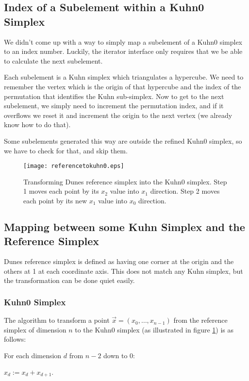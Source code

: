 \documentclass[english,a4paper]{article}
\begin{document}
\subsection{Index of a Subelement within a Kuhn0 Simplex}

We didn't come up with a way to simply map a subelement of a Kuhn0
simplex to an index number.  Luckily, the iterator interface only
requires that we be able to calculate the next subelement.

Each subelement is a Kuhn simplex which triangulates a hypercube.  We
need to remember the vertex which is the origin of that hypercube and
the index of the permutation that identifies the Kuhn sub-simplex.  Now
to get to the next subelement, we simply need to increment the
permutation index, and if it overflows we reset it and increment the
origin to the next vertex (we already know how to do that).

Some subelements generated this way are outside the refined Kuhn0
simplex, so we have to check for that, and skip them.

\begin{figure}
  \centering
  \texttt{[image: referencetokuhn0.eps]}
  \caption{\label{ref2kuhn0} Transforming Dunes reference simplex into
    the Kuhn0 simplex.  Step 1 moves each point by its $x_2$ value
    into $x_1$ direction.  Step 2 moves each point by its new $x_1$
    value into $x_0$ direction.}
\end{figure}

\subsection{Mapping between some Kuhn Simplex and the Reference Simplex}

Dunes reference simplex is defined as having one corner at the origin
and the others at 1 at each coordinate axis.  This does not match any
Kuhn simplex, but the transformation can be done quiet easily.

\subsubsection{Kuhn0 Simplex}

The algorithm to transform a point $\vec{x}=(x_0,\ldots,x_{n-1})$ from
the reference simplex of dimension $n$ to the Kuhn0 simplex (as
illustrated in figure \ref{ref2kuhn0}) is as follows:
\begin{compactitem}
\item For each dimension $d$ from $n-2$ down to 0:
  \begin{compactitem}
  \item $x_d:=x_d+x_{d+1}$.
  \end{compactitem}
\end{compactitem}\vspace{2ex}
\end{document}
